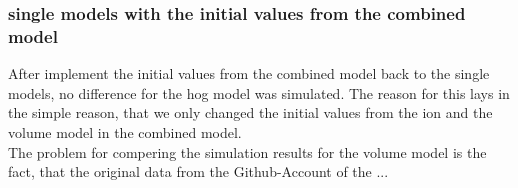 \subsubsection{single models with the initial values from the combined model}
After implement the initial values from the combined model back to the single models, no difference for the hog model was simulated. The reason for this lays in the simple reason, that we only changed the initial values from the ion and the volume model in the combined model.\\
The problem for compering the simulation results for the volume model is the fact, that the original data from the Github-Account of the ...

\newpage
